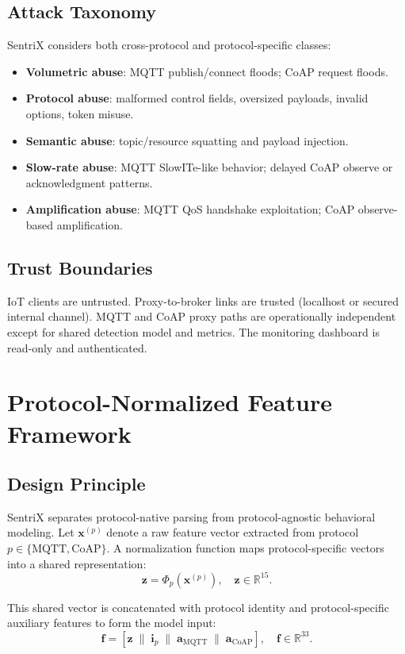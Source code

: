 \documentclass[conference]{IEEEtran}
\begin{document}
\subsection{Attack Taxonomy}
SentriX considers both cross-protocol and protocol-specific classes:
\begin{itemize}
\item \textbf{Volumetric abuse}: MQTT publish/connect floods; CoAP request floods.
\item \textbf{Protocol abuse}: malformed control fields, oversized payloads, invalid options, token misuse.
\item \textbf{Semantic abuse}: topic/resource squatting and payload injection.
\item \textbf{Slow-rate abuse}: MQTT SlowITe-like behavior; delayed CoAP observe or acknowledgment patterns.
\item \textbf{Amplification abuse}: MQTT QoS handshake exploitation; CoAP observe-based amplification.
\end{itemize}

\subsection{Trust Boundaries}
IoT clients are untrusted. Proxy-to-broker links are trusted (localhost or secured internal channel). MQTT and CoAP proxy paths are operationally independent except for shared detection model and metrics. The monitoring dashboard is read-only and authenticated.

\section{Protocol-Normalized Feature Framework}
\subsection{Design Principle}
SentriX separates protocol-native parsing from protocol-agnostic behavioral modeling. Let $\mathbf{x}^{(p)}$ denote a raw feature vector extracted from protocol $p \in \{\text{MQTT},\text{CoAP}\}$. A normalization function maps protocol-specific vectors into a shared representation:
\begin{equation}
\mathbf{z} = \Phi_p\left(\mathbf{x}^{(p)}\right), \quad \mathbf{z} \in \mathbb{R}^{15}.
\end{equation}

This shared vector is concatenated with protocol identity and protocol-specific auxiliary features to form the model input:
\begin{equation}
\mathbf{f} = [\mathbf{z} \;\|\; \mathbf{i}_p \;\|\; \mathbf{a}_{\text{MQTT}} \;\|\; \mathbf{a}_{\text{CoAP}}], \quad \mathbf{f} \in \mathbb{R}^{33}.
\end{equation}
\end{document}
